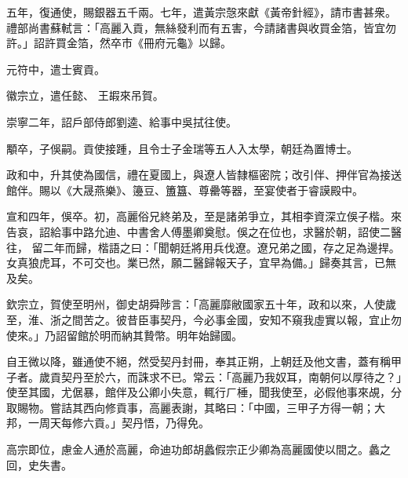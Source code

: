 \begin{pinyinscope}
 五年，復通使，賜銀器五千兩。七年，遣黃宗愨來獻《黃帝針經》，請市書甚衆。禮部尚書蘇軾言：「高麗入貢，無絲發利而有五害，今請諸書與收買金箔，皆宜勿許。」詔許買金箔，然卒市《冊府元龜》以歸。



 元符中，遣士賓貢。



 徽宗立，遣任懿、
 王嘏來吊賀。



 崇寧二年，詔戶部侍郎劉逵、給事中吳拭往使。



 顒卒，子俁嗣。貢使接踵，且令士子金瑞等五人入太學，朝廷為置博士。



 政和中，升其使為國信，禮在夏國上，與遼人皆隸樞密院；改引伴、押伴官為接送館伴。賜以《大晟燕樂》、籩豆、簠簋、尊罍等器，至宴使者于睿謨殿中。



 宣和四年，俁卒。初，高麗俗兄終弟及，至是諸弟爭立，其相李資深立俁子楷。來告哀，詔給事中路允迪、中書舍人傅墨卿奠慰。俁之在位也，求醫於朝，詔使二醫往，
 留二年而歸，楷語之曰：「聞朝廷將用兵伐遼。遼兄弟之國，存之足為邊捍。女真狼虎耳，不可交也。業已然，願二醫歸報天子，宜早為備。」歸奏其言，已無及矣。



 欽宗立，賀使至明州，御史胡舜陟言：「高麗靡敝國家五十年，政和以來，人使歲至，淮、浙之間苦之。彼昔臣事契丹，今必事金國，安知不窺我虛實以報，宜止勿使來。」乃詔留館於明而納其贄幣。明年始歸國。



 自王微以降，雖通使不絕，然受契丹封冊，奉其正朔，上朝廷及他文書，蓋有稱甲
 子者。歲貢契丹至於六，而誅求不已。常云：「高麗乃我奴耳，南朝何以厚待之？」使至其國，尤倨暴，館伴及公卿小失意，輒行ㄏ棰，聞我使至，必假他事來覘，分取賜物。嘗詰其西向修貢事，高麗表謝，其略曰：「中國，三甲子方得一朝；大邦，一周天每修六貢。」契丹悟，乃得免。



 高宗即位，慮金人通於高麗，命迪功郎胡蠡假宗正少卿為高麗國使以間之。蠡之回，史失書。




\end{pinyinscope}

